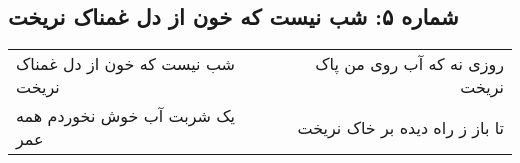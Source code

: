 \begin{center}
\section*{شماره ۵: شب نیست که خون از دل غمناک نریخت}
\label{sec:005}
\begin{longtable}{l p{0.5cm} r}
شب نیست که خون از دل غمناک نریخت
&&
روزی نه که آب روی من پاک نریخت
\\
یک شربت آب خوش نخوردم همه عمر
&&
تا باز ز راه دیده بر خاک نریخت
\\
\end{longtable}
\end{center}
